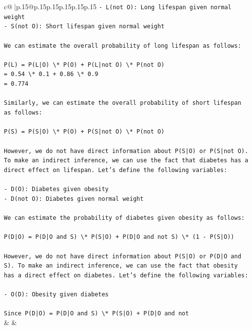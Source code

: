 \documentclass{article}
\begin{document}
{\begin{supertabular}{c@{$\;$}|p{.15\linewidth}@{}p{.15\linewidth}p{.15\linewidth}p{.15\linewidth}p{.15\linewidth}p{.15\linewidth}}
{{{\texttt{{-} L(not O): Long lifespan given normal weight} \\
\texttt{{-} S(not O): Short lifespan given normal weight} \\
\\ 
\texttt{We can estimate the overall probability of long lifespan as follows:} \\
\\ 
\texttt{P(L) = P(L|O) \textbackslash{}* P(O) + P(L|not O) \textbackslash{}* P(not O)} \\
\texttt{= 0.54 \textbackslash{}* 0.1 + 0.86 \textbackslash{}* 0.9} \\
\texttt{= 0.774} \\
\\ 
\texttt{Similarly, we can estimate the overall probability of short lifespan as follows:} \\
\\ 
\texttt{P(S) = P(S|O) \textbackslash{}* P(O) + P(S|not O) \textbackslash{}* P(not O)} \\
\\ 
\texttt{However, we do not have direct information about P(S|O) or P(S|not O). To make an indirect inference, we can use the fact that diabetes has a direct effect on lifespan. Let's define the following variables:} \\
\\ 
\texttt{{-} D(O): Diabetes given obesity} \\
\texttt{{-} D(not O): Diabetes given normal weight} \\
\\ 
\texttt{We can estimate the probability of diabetes given obesity as follows:} \\
\\ 
\texttt{P(D|O) = P(D|O and S) \textbackslash{}* P(S|O) + P(D|O and not S) \textbackslash{}* (1 {-} P(S|O))} \\
\\ 
\texttt{However, we do not have direct information about P(S|O) or P(D|O and S). To make an indirect inference, we can use the fact that obesity has a direct effect on diabetes. Let's define the following variables:} \\
\\ 
\texttt{{-} O(D): Obesity given diabetes} \\
\\ 
\texttt{Since P(D|O) = P(D|O and S) \textbackslash{}* P(S|O) + P(D|O and not} \\
            }
        }
    }
    & & \\ \\


\end{supertabular}}
\end{document}
